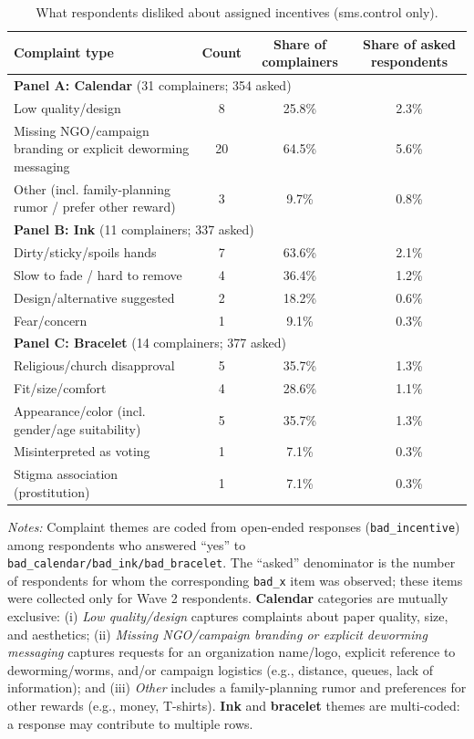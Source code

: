 \documentclass[12pt,a4paper]{article}
\begin{document}
%
\begin{table}[!htbp]\centering
\caption{What respondents disliked about assigned incentives (sms.control only).}
\label{tab:bad_breakdown_combined}
\begin{tabular}{lccc}
\toprule
Complaint type & Count & Share of complainers & Share of asked respondents \\
\midrule
\multicolumn{4}{l}{\textbf{Panel A: Calendar} (31 complainers; 354 asked)} \\
Low quality/design & 8 & 25.8\% & 2.3\% \\
Missing NGO/campaign branding or explicit deworming messaging & 20 & 64.5\% & 5.6\% \\
Other (incl. family-planning rumor / prefer other reward) & 3 & 9.7\% & 0.8\% \\
\midrule
\multicolumn{4}{l}{\textbf{Panel B: Ink} (11 complainers; 337 asked)} \\
Dirty/sticky/spoils hands & 7 & 63.6\% & 2.1\% \\
Slow to fade / hard to remove & 4 & 36.4\% & 1.2\% \\
Design/alternative suggested & 2 & 18.2\% & 0.6\% \\
Fear/concern & 1 & 9.1\% & 0.3\% \\
\midrule
\multicolumn{4}{l}{\textbf{Panel C: Bracelet} (14 complainers; 377 asked)} \\
Religious/church disapproval & 5 & 35.7\% & 1.3\% \\
Fit/size/comfort & 4 & 28.6\% & 1.1\% \\
Appearance/color (incl. gender/age suitability) & 5 & 35.7\% & 1.3\% \\
Misinterpreted as voting & 1 & 7.1\% & 0.3\% \\
Stigma association (prostitution) & 1 & 7.1\% & 0.3\% \\
\bottomrule
\end{tabular}
\begin{minipage}{0.95\textwidth}\footnotesize
\textit{Notes:} Complaint themes are coded from open-ended responses (\texttt{bad\_incentive}) among respondents who answered ``yes'' to \texttt{bad\_calendar/bad\_ink/bad\_bracelet}. The ``asked'' denominator is the number of respondents for whom the corresponding \texttt{bad\_x} item was observed; these items were collected only for Wave 2 respondents. \textbf{Calendar} categories are mutually exclusive: (i) \emph{Low quality/design} captures complaints about paper quality, size, and aesthetics; (ii) \emph{Missing NGO/campaign branding or explicit deworming messaging} captures requests for an organization name/logo, explicit reference to deworming/worms, and/or campaign logistics (e.g., distance, queues, lack of information); and (iii) \emph{Other} includes a family-planning rumor and preferences for other rewards (e.g., money, T-shirts). \textbf{Ink} and \textbf{bracelet} themes are multi-coded: a response may contribute to multiple rows.
\end{minipage}
\end{table}
\end{document}
